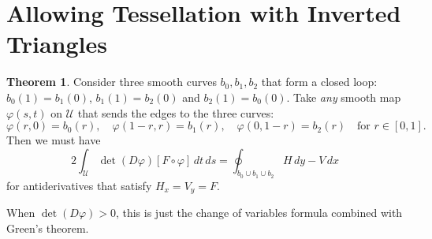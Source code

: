 \documentclass[oneside, reqno]{amsart}
\theoremstyle{definition}
\newtheorem{theorem}{Theorem}[section]
\newcommand{\utri}{\mathcal{U}}
\begin{document}
\section{Allowing Tessellation with Inverted Triangles}

\begin{theorem}\label{theorem:bad-triangle}
Consider three smooth curves
\(b_0, b_1, b_2\) that form a closed loop: \(b_0(1) = b_1(0)\),
\(b_1(1) = b_2(0)\) and \(b_2(1) = b_0(0)\).
Take \emph{any} smooth map \(\varphi(s, t)\) on \(\utri\) that
sends the edges to the three curves:
\begin{equation}
\varphi(r, 0) = b_0(r), \quad \varphi(1 - r, r) = b_1(r),
  \quad \varphi(0, 1 - r) = b_2(r) \quad \text{for } r \in \left[0, 1\right].
\end{equation}
Then we must have
\begin{equation}
2 \int_{\utri} \det(D\varphi) \left[F \circ \varphi\right] \, dt \, ds =
\oint_{b_0 \cup b_1 \cup b_2} H \, dy - V \, dx
\end{equation}
for antiderivatives that satisfy \(H_x = V_y = F\).

When \(\det(D\varphi) > 0\), this is just the change of variables
formula combined with Green's theorem.
\end{theorem}
\end{document}
